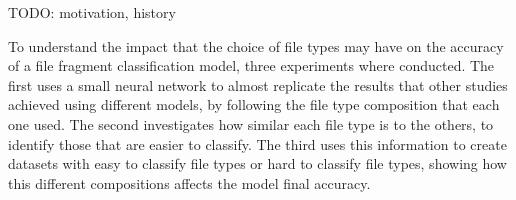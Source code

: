 TODO: motivation, history

To understand the impact that the choice of file types may have on the accuracy of a file fragment classification model, three experiments where conducted. The first uses a small neural network to almost replicate the results that other studies achieved using different models, by following the file type composition that each one used. The second investigates how similar each file type is to the others, to identify those that are easier to classify. The third uses this information to create datasets with easy to classify file types or hard to classify file types, showing how this different compositions affects the model final accuracy.